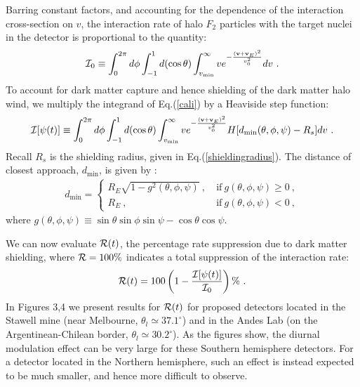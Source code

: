 \documentclass[12pt]{article}
\begin{document}
Barring constant factors, and accounting for the dependence of the interaction cross-section on $v$, the interaction rate of halo $F_2$ particles with the target nuclei in the detector is proportional to the quantity:
%
\begin{eqnarray}
{\cal I} _0 \equiv \int _0 ^{2\pi} d\phi \int _{-1} ^{1} d(\cos \theta) \int _{v _{\min}} ^{\infty} ve ^{-\frac{(\mathbf{v} + \mathbf{v} _E) ^2}{v _0 ^2}} dv \ .
\label{cali}
\end{eqnarray}
%
To account for dark matter capture and hence shielding of the dark matter halo wind, we multiply the integrand of Eq.(\ref{cali}) by a Heaviside step function:
%
\begin{eqnarray}
{\cal I}[\psi (t)] \equiv \int _0 ^{2\pi} d\phi \int _{-1} ^{1} d(\cos \theta) \int _{v _{\min}} ^{\infty} ve ^{-\frac{(\mathbf{v} + \mathbf{v} _E) ^2}{v _0 ^2}} H[d _{\min}(\theta , \phi , \psi) - R _s] dv \ .
\label{ipsit}
\end{eqnarray}
%
Recall $R _s$ is the shielding radius, given in Eq.(\ref{shieldingradius}). The distance of closest approach, $d _{\min}$, is given by \cite{footdiurnal}:
%
\begin{eqnarray}
d _{\min} = \begin{cases}
            R _E\sqrt{1 - g ^2(\theta , \phi , \psi)} \ , \ & \text{if} \ g(\theta, \phi , \psi) \geq 0 \ , \\
            R _E \ , \ & \text{if} \ g(\theta , \phi , \psi) < 0 \ ,
            \end{cases}
\end{eqnarray}
%
where $g(\theta , \phi , \psi) \equiv \sin \theta \sin \phi \sin \psi - \cos \theta \cos \psi$.

We can now evaluate ${\cal R}(t)$, the percentage rate suppression due to dark matter shielding, where ${\cal R} = 100 \%$ indicates a total suppression of the interaction rate:
%
\begin{eqnarray}
{\cal R}(t) = 100\left (1 - \frac{{\cal I}[\psi (t)]}{{\cal I} _0} \right ) \% \ .
\label{calr}
\end{eqnarray}
%
In Figures 3,4 we present results for ${\cal R}(t)$ for proposed detectors located in the Stawell mine (near Melbourne, $\theta _l \simeq 37.1 ^{\circ}$) and in the Andes Lab (on the Argentinean-Chilean border, $\theta _l \simeq 30.2 ^{\circ}$). As the figures show, the diurnal modulation effect can be very large for these Southern hemisphere detectors. For a detector located in the Northern hemisphere, such an effect is instead expected to be much smaller, and hence more difficult to observe.
\end{document}
